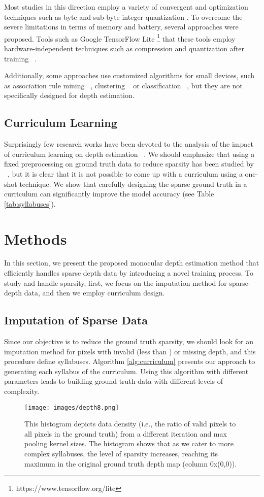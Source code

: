 \documentclass{article}
\begin{document}
Most studies in this direction employ a variety of convergent and optimization techniques such as byte and sub-byte integer quantization \cite{choi2018pact}. 
To overcome the severe limitations in terms of memory and battery, several approaches were proposed. Tools such as Google TensorFlow Lite  \footnote{https://www.tensorflow.org/lite} that these tools employ hardware-independent techniques such as compression and quantization after training ~\cite{capotondi2020cmix,ghamari2021quantization}.

Additionally, some approaches use customized algorithms for small devices, such as association rule mining ~\cite{raw2016scalable}, clustering ~\cite{raw2019indexing} or classification ~\cite{sefr}, but they are not specifically designed for depth estimation.

\subsection{Curriculum Learning}  
Surprisingly few research works have been devoted to the analysis of the impact of curriculum learning on depth estimation ~\cite{bengio2009curriculum}. We should emphasize that using a fixed preprocessing on ground truth data to reduce sparsity has been studied by ~\cite{uhrig2017sparsity}, but it is clear that it is not possible to come up with a curriculum using a one-shot technique. We show that carefully designing the sparse ground truth in a curriculum can significantly improve the model accuracy (see Table \ref{tab:syllabuses}).

\section{Methods}
\label{sec:proposed_method}
In this section, we present the proposed monocular depth estimation method that efficiently handles sparse depth data by introducing a novel training process. To study and handle sparsity, first, we focus on the imputation method for sparse-depth data, and then we employ curriculum design.

\subsection{Imputation of Sparse Data} 
Since our objective is to reduce the ground truth sparsity, we should look for an imputation method for pixels with invalid (less than ) or missing depth, and this procedure define syllabuses. Algorithm \ref{alg:curriculum} presents our approach to generating each syllabus of the curriculum. Using this algorithm with different parameters leads to building ground truth data with different levels of complexity.
\begin{figure}[ht]
    \centering
    \texttt{[image: images/depth8.png]}
    \caption{This histogram depicts data density (i.e., the ratio of valid pixels to all pixels in the ground truth) from a different iteration and max pooling kernel sizes. The histogram shows that as we cater to more complex syllabuses, the level of sparsity increases, reaching its maximum in the original ground truth depth map (column 0x(0,0)).}
    \label{fig:hist2}
\end{figure}
\end{document}
